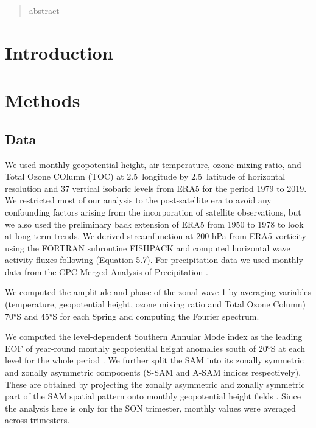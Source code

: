 \documentclass[smallextended]{svjour3}       %
\begin{document}
\begin{abstract}
abstract
\\
\keywords{
         \and
    }


\end{abstract}


\def\spacingset#1{\renewcommand{\baselinestretch}%
{#1}\small\normalsize} \spacingset{1}


\hypertarget{introduction}{%
\section{Introduction}\label{introduction}}

\hypertarget{methods}{%
\section{Methods}\label{methods}}

\hypertarget{data}{%
\subsection{Data}\label{data}}

We used monthly geopotential height, air temperature, ozone mixing ratio, and Total Ozone COlumn (TOC) at 2.5\degree~longitude by 2.5\degree~latitude of horizontal resolution and 37 vertical isobaric levels from ERA5 \citep{era5} for the period 1979 to 2019. We restricted most of our analysis to the post-satellite era to avoid any confounding factors arising from the incorporation of satellite observations, but we also used the preliminary back extension of ERA5 from 1950 to 1978 \citep{era5be} to look at long-term trends. We derived streamfunction at 200 hPa from ERA5 vorticity using the FORTRAN subroutine FISHPACK \citep{fishpack} and computed horizontal wave activity fluxes following \citet{plumb1985} (Equation 5.7). For precipitation data we used monthly data from the CPC Merged Analysis of Precipitation \citep{cmap}.

We computed the amplitude and phase of the zonal wave 1 by averaging variables (temperature, geopotential height, ozone mixing ratio and Total Ozone Column) 70°S and 45°S for each Spring and computing the Fourier spectrum.

We computed the level-dependent Southern Annular Mode index as the leading EOF of year-round monthly geopotential height anomalies south of 20ºS at each level for the whole period \citep{baldwin2009}. We further split the SAM into its zonally symmetric and zonally asymmetric components (S-SAM and A-SAM indices respectively). These are obtained by projecting the zonally asymmetric and zonally symmetric part of the SAM spatial pattern onto monthly geopotential height fields \citep{campitelli2021}. Since the analysis here is only for the SON trimester, monthly values were averaged across trimesters.
\end{document}
